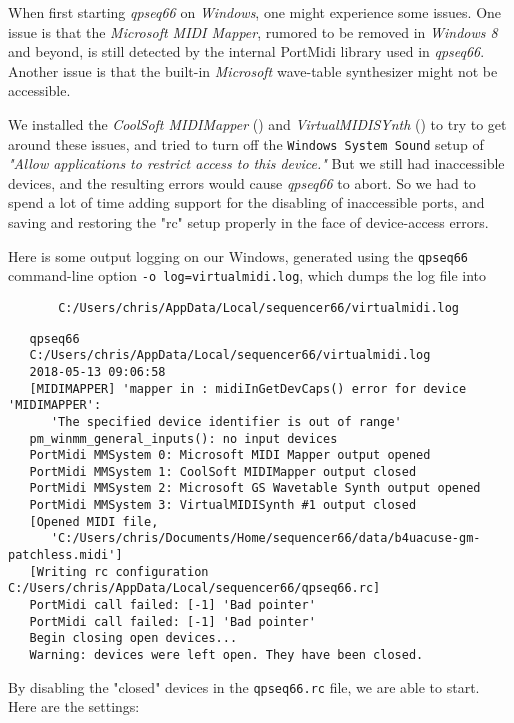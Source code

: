     When first starting \textsl{qpseq66} on \textsl{Windows}, one might
    experience some issues.  One issue is that the \textsl{Microsoft MIDI
    Mapper}, rumored to be removed in \textsl{Windows 8} and beyond, is still
    detected by the internal PortMidi library used in \textsl{qpseq66}.
    Another issue is that the built-in \textsl{Microsoft} wave-table
    synthesizer might not be accessible.

    We installed the
    \textsl{CoolSoft MIDIMapper} (\cite{midimapper}) and
    \textsl{VirtualMIDISYnth} (\cite{midisynth}) to try to get
    around these issues, and tried to turn off the
    \texttt{Windows System Sound} setup of
    \textsl{"Allow applications to restrict access to this device."}
    But we still had
    inaccessible devices, and the resulting errors would cause
    \textsl{qpseq66} to
    abort.  So we had to spend a lot of time adding support for
    the disabling of
    inaccessible ports, and saving and restoring the "rc" setup properly
    in the face of device-access errors.

    Here is some output logging on our Windows, generated using the
    \texttt{qpseq66} command-line option
    \texttt{-o log=virtualmidi.log}, which dumps the log file into

   \begin{verbatim}
       C:/Users/chris/AppData/Local/sequencer66/virtualmidi.log
   \end{verbatim}

\begin{verbatim}
   qpseq66 
   C:/Users/chris/AppData/Local/sequencer66/virtualmidi.log 
   2018-05-13 09:06:58 
   [MIDIMAPPER] 'mapper in : midiInGetDevCaps() error for device 'MIDIMAPPER':
      'The specified device identifier is out of range'
   pm_winmm_general_inputs(): no input devices
   PortMidi MMSystem 0: Microsoft MIDI Mapper output opened
   PortMidi MMSystem 1: CoolSoft MIDIMapper output closed
   PortMidi MMSystem 2: Microsoft GS Wavetable Synth output opened
   PortMidi MMSystem 3: VirtualMIDISynth #1 output closed
   [Opened MIDI file,
      'C:/Users/chris/Documents/Home/sequencer66/data/b4uacuse-gm-patchless.midi']
   [Writing rc configuration C:/Users/chris/AppData/Local/sequencer66/qpseq66.rc]
   PortMidi call failed: [-1] 'Bad pointer'
   PortMidi call failed: [-1] 'Bad pointer'
   Begin closing open devices...
   Warning: devices were left open. They have been closed.
\end{verbatim}

    By disabling the "closed" devices in the \texttt{qpseq66.rc} file,
    we are able to start.  Here are the settings:

